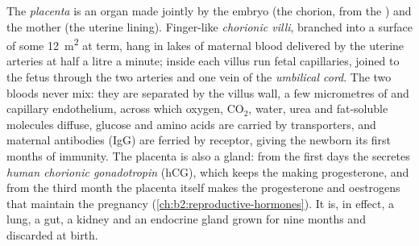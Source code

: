 \begin{definition}\label{def:b2:mammal-reproduction:placenta}
The \emph{placenta} is an organ made jointly by the embryo (the
chorion, from the ) and the mother (the uterine lining).
Finger-like \emph{chorionic villi}, branched into a surface of some
\qty{12}{m^2} at term, hang in lakes of maternal blood delivered by
the uterine arteries at half a litre a minute; inside each villus
run fetal capillaries, joined to the fetus through the two arteries
and one vein of the \emph{umbilical cord}. The two bloods never mix:
they are separated by the villus wall, a few micrometres of
 and capillary endothelium, across which oxygen,
$\mathrm{CO_2}$, water, urea and fat-soluble molecules diffuse,
glucose and amino acids are carried by transporters, and maternal
antibodies (IgG) are ferried by receptor, giving the newborn its
first months of immunity. The placenta is also a gland: from the
first days the  secretes \emph{human chorionic
gonadotropin} (hCG), which keeps the  making
progesterone, and from the third month the placenta itself makes the
progesterone and oestrogens that maintain the pregnancy
(\cref{ch:b2:reproductive-hormones}). It is, in effect, a lung, a
gut, a kidney and an endocrine gland grown for nine months and
discarded at birth.
\end{definition}

